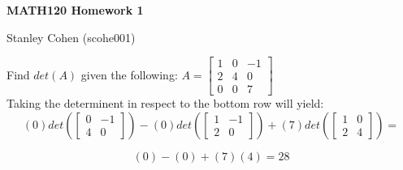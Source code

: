 \documentclass{article}
\begin{document}
 
 
\centerline{\large \bf MATH120 Homework 1}
\centerline{Stanley Cohen (scohe001)}
 
\begin{problem}
    Find $det(A)$ given the following: $A=
    \begin{bmatrix}
        1 & 0 & -1\\
        2 & 4 & 0\\
        0 & 0 & 7
    \end{bmatrix}$\\

    Taking the determinent in respect to the bottom row will yield: 
    $$(0)det(\begin{bmatrix} 0 & -1 \\ 4 & 0 \end{bmatrix}) - 
    (0)det(\begin{bmatrix} 1 & -1 \\ 2 & 0 \end{bmatrix}) + 
    (7)det(\begin{bmatrix} 1 & 0 \\ 2 & 4 \end{bmatrix}) = $$

    $$(0) - (0) + (7)(4) = 28$$
\end{problem}
    
\end{document}
